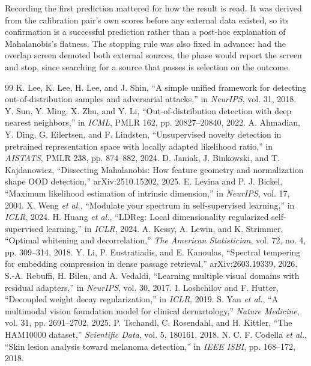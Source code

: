 \documentclass[11pt,a4paper]{article}
\begin{document}
Recording the first prediction mattered for how the result is read. It was
derived from the calibration pair's own scores before any external data
existed, so its confirmation is a successful prediction rather than a
post-hoc explanation of Mahalanobis's flatness. The stopping rule was also
fixed in advance: had the overlap screen demoted both external sources, the
phase would report the screen and stop, since searching for a source that
passes is selection on the outcome.

\begin{thebibliography}{99}
 K. Lee, K. Lee, H. Lee, and J. Shin, ``A simple unified framework for detecting out-of-distribution samples and adversarial attacks,'' in \emph{NeurIPS}, vol. 31, 2018.
 Y. Sun, Y. Ming, X. Zhu, and Y. Li, ``Out-of-distribution detection with deep nearest neighbors,'' in \emph{ICML}, PMLR 162, pp. 20827--20840, 2022.
 A. Ahmadian, Y. Ding, G. Eilertsen, and F. Lindsten, ``Unsupervised novelty detection in pretrained representation space with locally adapted likelihood ratio,'' in \emph{AISTATS}, PMLR 238, pp. 874--882, 2024.
 D. Janiak, J. Binkowski, and T. Kajdanowicz, ``Dissecting Mahalanobis: How feature geometry and normalization shape OOD detection,'' arXiv:2510.15202, 2025.
 E. Levina and P. J. Bickel, ``Maximum likelihood estimation of intrinsic dimension,'' in \emph{NeurIPS}, vol. 17, 2004.
 X. Weng \emph{et al.}, ``Modulate your spectrum in self-supervised learning,'' in \emph{ICLR}, 2024.
 H. Huang \emph{et al.}, ``LDReg: Local dimensionality regularized self-supervised learning,'' in \emph{ICLR}, 2024.
 A. Kessy, A. Lewin, and K. Strimmer, ``Optimal whitening and decorrelation,'' \emph{The American Statistician}, vol. 72, no. 4, pp. 309--314, 2018.
 Y. Li, P. Eustratiadis, and E. Kanoulas, ``Spectral tempering for embedding compression in dense passage retrieval,'' arXiv:2603.19339, 2026.
 S.-A. Rebuffi, H. Bilen, and A. Vedaldi, ``Learning multiple visual domains with residual adapters,'' in \emph{NeurIPS}, vol. 30, 2017.
 I. Loshchilov and F. Hutter, ``Decoupled weight decay regularization,'' in \emph{ICLR}, 2019.
 S. Yan \emph{et al.}, ``A multimodal vision foundation model for clinical dermatology,'' \emph{Nature Medicine}, vol. 31, pp. 2691--2702, 2025.
 P. Tschandl, C. Rosendahl, and H. Kittler, ``The HAM10000 dataset,'' \emph{Scientific Data}, vol. 5, 180161, 2018.
 N. C. F. Codella \emph{et al.}, ``Skin lesion analysis toward melanoma detection,'' in \emph{IEEE ISBI}, pp. 168--172, 2018.

\end{thebibliography}
\end{document}
